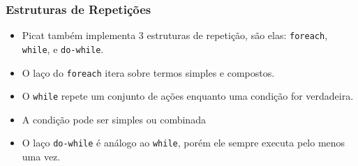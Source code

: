     
    
    
    
    
\begin{frame}[fragile]
\frametitle{Estruturas de Repetições}
       

\begin{itemize}
    
    \item Picat também implementa 3 estruturas de repetição, são elas:
    \texttt{foreach}, \texttt{while}, e \texttt{do-while}.
    
    \pause
    \item O laço do  \texttt{foreach}  itera sobre termos simples e compostos.
    
        \pause
    \item O  \texttt{while} repete um conjunto de ações enquanto uma 
     condição for verdadeira.
     
        \pause
    \item A condição pode ser simples ou combinada
     
     
        \pause
    \item O laço \texttt{do-while} é análogo ao  \texttt{while}, porém ele 
    sempre executa pelo menos uma vez.
\end{itemize}
\end{frame}    


